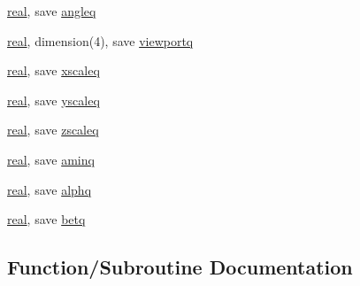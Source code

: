 \begin{DoxyCompactItemize}
\item 
\hyperlink{read__watch_83_8txt_abdb62bde002f38ef75f810d3a905a823}{real}, save \hyperlink{namespacem__pixel__slices_ad82933d6a03faeb06a790664ed1e4cb7}{angleq}
\item 
\hyperlink{read__watch_83_8txt_abdb62bde002f38ef75f810d3a905a823}{real}, dimension(4), save \hyperlink{namespacem__pixel__slices_a46f6b80eeb99ecff5fd18e41d1b17f0a}{viewportq}
\item 
\hyperlink{read__watch_83_8txt_abdb62bde002f38ef75f810d3a905a823}{real}, save \hyperlink{namespacem__pixel__slices_aea975665739d351db83cfcc41e1914db}{xscaleq}
\item 
\hyperlink{read__watch_83_8txt_abdb62bde002f38ef75f810d3a905a823}{real}, save \hyperlink{namespacem__pixel__slices_aff993c23736cb8fc57b8b3ebe5021ba5}{yscaleq}
\item 
\hyperlink{read__watch_83_8txt_abdb62bde002f38ef75f810d3a905a823}{real}, save \hyperlink{namespacem__pixel__slices_af1ea5e682e81c2984c650485935a93e8}{zscaleq}
\item 
\hyperlink{read__watch_83_8txt_abdb62bde002f38ef75f810d3a905a823}{real}, save \hyperlink{namespacem__pixel__slices_ae256fff4bec0279eb4e2439eb3973a1f}{aminq}
\item 
\hyperlink{read__watch_83_8txt_abdb62bde002f38ef75f810d3a905a823}{real}, save \hyperlink{namespacem__pixel__slices_a72bdfc50e6b4b5a8b123083e4e529e9c}{alphq}
\item 
\hyperlink{read__watch_83_8txt_abdb62bde002f38ef75f810d3a905a823}{real}, save \hyperlink{namespacem__pixel__slices_ab90a7c0b6645a0405a9c5e9feff7b153}{betq}
\end{DoxyCompactItemize}


\subsection{Function/\+Subroutine Documentation}
\mbox{\label{namespacem__pixel__slices_afcc122fe448b5f806c0a372a203cd9ea}} 
